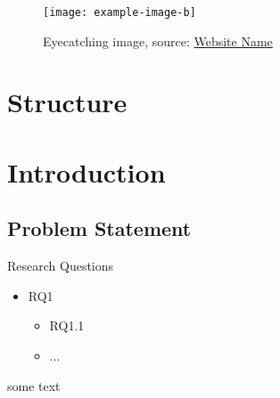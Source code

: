 \documentclass[
    USenglish,
    accentcolor=9c,
    fontsize= 12pt,
    a4paper,
    aspectratio=169,
    colorback=true,
    fancy_row_colors,
    leqno,
    fleqn,
    boxarc=3pt,
    fleqn,
    main,
    design=2008, %
]{algoslides}
\date{January 01, 2025}
\begin{document}
    \maketitle{}

    \begin{frame}
        \slidehead{}
        \vspace{-2em}
        \begin{figure}
            \centering
            \texttt{[image: example-image-b]}
            \caption{Eyecatching image, source: \href{https://www.example.com/images/something}{Website Name}}
            \label{fig:paperwork-horror}
        \end{figure}
    \end{frame}
    \section*{Structure}
    \begin{frame}[c]
        \slidehead{}
        \tableofcontents[hideothersubsections]{}
    \end{frame}

    \section{Introduction}

    \subsection{Problem Statement}
    \begin{frame}
        \slidehead{}
        Research Questions
        \begin{itemize}
            \item RQ1
                \begin{itemize}
                    \item RQ1.1
                    \item ...
                \end{itemize}
        \end{itemize}
        some text
    \end{frame}
\end{document}
